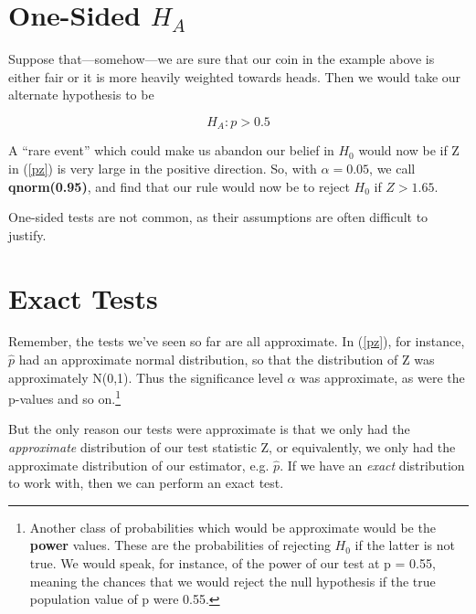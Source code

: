 \section{One-Sided $H_A$}

Suppose that---somehow---we are sure that our coin in the example above
is either fair or it is more heavily weighted towards heads.  Then we
would take our alternate hypothesis to be

\begin{equation}
\label{onesideha}
H_A: p > 0.5
\end{equation}

A ``rare event'' which could make us abandon our belief in $H_0$ would
now be if Z in (\ref{pz}) is very large in the positive direction.  So,
with $\alpha = 0.05$, we call {\bf qnorm(0.95)}, and find that our rule
would now be to reject $H_0$ if $Z > 1.65$.

One-sided tests are not common, as their assumptions are often difficult
to justify.

% 
% 
% 
% 
% 

\section{Exact Tests}

Remember, the tests we've seen so far are all approximate.  In
(\ref{pz}), for instance, $\widehat{p}$ had an approximate normal
distribution, so that the distribution of Z was approximately N(0,1).
Thus the significance level $\alpha$ was approximate, as were the
p-values and so on.\footnote{Another class of probabilities which would
be approximate would be the {\bf power} values.  These are the
probabilities of rejecting $H_0$ if the latter is not true.  We would
speak, for instance, of the power of our test at p = 0.55, meaning the
chances that we would reject the null hypothesis if the true population
value of p were 0.55.}

But the only reason our tests were approximate is that we only had the
{\it approximate} distribution of our test statistic Z, or equivalently,
we only had the approximate distribution of our estimator, e.g.
$\widehat{p}$.  If we have an {\it exact} distribution to work with,
then we can perform an exact test.

